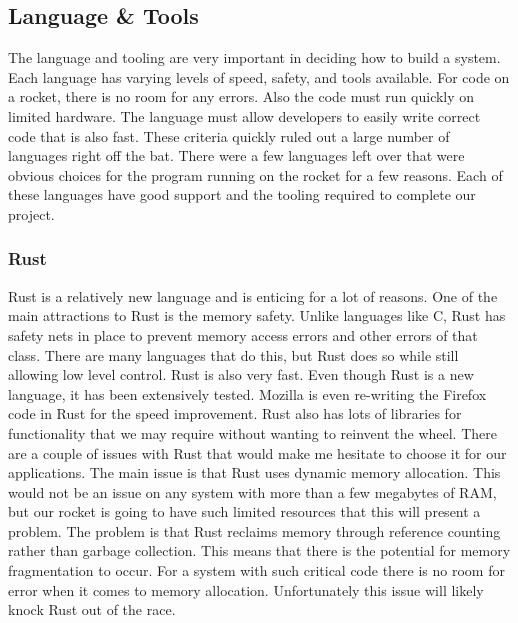 \documentclass[onecolumn, draftclsnofoot,10pt, compsoc]{IEEEtran}
\begin{document}
\subsection{Language \& Tools}
The language and tooling are very important in deciding how to build a system.
Each language has varying levels of speed, safety, and tools available.
For code on a rocket, there is no room for any errors.
Also the code must run quickly on limited hardware.
The language must allow developers to easily write correct code that is also fast.
These criteria quickly ruled out a large number of languages right off the bat.
There were a few languages left over that were obvious choices for the program running on the rocket for a few reasons.
Each of these languages have good support and the tooling required to complete our project.

\subsubsection{Rust}
Rust is a relatively new language and is enticing for a lot of reasons.
One of the main attractions to Rust is the memory safety.
Unlike languages like C, Rust has safety nets in place to prevent memory access errors and other errors of that class.
There are many languages that do this, but Rust does so while still allowing low level control.
Rust is also very fast.
Even though Rust is a new language, it has been extensively tested.
Mozilla is even re-writing the Firefox code in Rust for the speed improvement.
Rust also has lots of libraries for functionality that we may require without wanting to reinvent the wheel.
There are a couple of issues with Rust that would make me hesitate to choose it for our applications.
The main issue is that Rust uses dynamic memory allocation.
This would not be an issue on any system with more than a few megabytes of RAM, but our rocket is going to have such limited resources that this will present a problem.
The problem is that Rust reclaims memory through reference counting rather than garbage collection.
This means that there is the potential for memory fragmentation to occur.
For a system with such critical code there is no room for error when it comes to memory allocation.
Unfortunately this issue will likely knock Rust out of the race.
\end{document}
